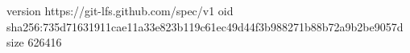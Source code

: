 version https://git-lfs.github.com/spec/v1
oid sha256:735d71631911cae11a33e823b119c61ec49d44f3b988271b88b72a9b2be9057d
size 626416
